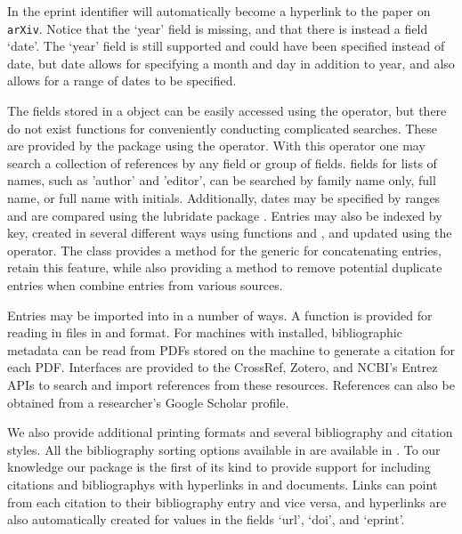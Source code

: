 \documentclass[article]{jss}\usepackage[]{graphicx}\usepackage[]{color}
\newcommand{\ourpkg}{\pkg{RefManageR}}
\newcommand{\bt}{\`{}}
\begin{document}
In \Biblatex{} the eprint identifier will automatically become a hyperlink to the paper on \texttt{arXiv}.  Notice that the `year' field is missing, and that there is instead a field `date'.  The `year' field is still supported and could have been specified instead of date, but date allows for specifying a month and day in addition to year, and also allows for a range of dates to be specified.

The \Bibtex{} fields stored in a  object can be easily accessed using the \code{\bt$\bt} operator, but there do not exist functions for conveniently conducting complicated searches.  These are provided by the \ourpkg{} package using the \code{\bt[\bt} operator.  With this operator one may search a collection of references by any field or group of fields.  \Biblatex{} fields for lists of names, such as 'author' and 'editor', can be searched by family name only, full name, or full name with initials.  Additionally, dates may be specified by ranges and are compared using the lubridate package \citep{lubridate}.  Entries may also be indexed by key, created in several different ways using functions  and , and updated using the \code{\bt[<-\bt} operator.  The  class provides a method for the  generic for concatenating entries, retain this feature, while also providing a  method to remove potential duplicate entries when combine entries from various sources.

Entries may be imported into \R{} in a number of ways.  A function is provided for reading in  files in \Biblatex{} and \Bibtex{} format.  For machines with  installed, bibliographic metadata can be read from PDFs stored on the machine to generate a citation for each PDF.  Interfaces are provided to the CrossRef, Zotero, and NCBI's Entrez APIs to search and import references from these resources.  References can also be obtained from a researcher's Google Scholar profile.

We also provide additional printing formats and several bibliography and citation styles.  All the bibliography sorting options available in \Biblatex{} are available in \ourpkg{}.  To our knowledge our package is the first of its kind to provide support for including citations and bibliographys with hyperlinks in  and  documents.  Links can point from each citation to their bibliography entry and vice versa, and hyperlinks are also automatically created for values in the \Biblatex{} fields `url', `doi', and `eprint'.
\end{document}
